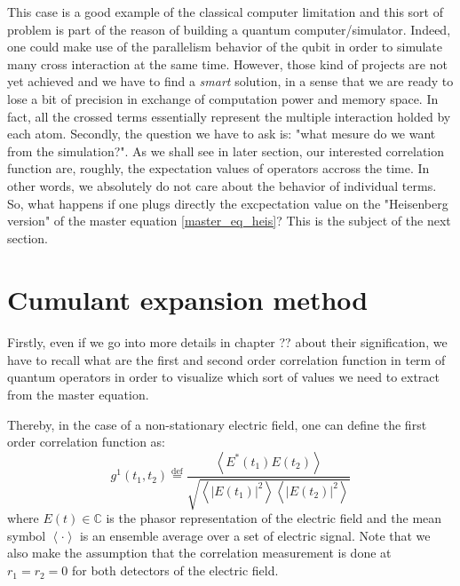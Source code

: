 \documentclass[12pt]{report}
\begin{document}
This case is a good example of the classical computer limitation and this sort of problem is part of the reason of building a quantum computer/simulator. Indeed, one could make use of the parallelism behavior of the qubit in order to simulate many cross interaction at the same time. However, those kind of projects are not yet achieved and we have to find a \textit{smart} solution, in a sense that we are ready to lose a bit of precision in exchange of computation power and memory space. In fact, all the crossed terms essentially represent the multiple interaction holded by each atom. Secondly, the question we have to ask is: "what mesure do we want from the simulation?". As we shall see in later section, our interested correlation function are, roughly, the expectation values of operators accross the time. In other words, we absolutely do not care about the behavior of individual terms. So, what happens if one plugs directly the excpectation value on the "Heisenberg version" of the master equation \eqref{master_eq_heis}? This is the subject of the next section.

\section{Cumulant expansion method}
\paragraph{}

Firstly, even if we go into more details in chapter ?? about their signification, we have to recall what are the first and second order correlation function in term of quantum operators in order to visualize which sort of values we need to extract from the master equation.

Thereby, in the case of a non-stationary electric field, one can define the first order correlation function as:
\begin{equation}
\label{g1_classic_def}
{\displaystyle g ^{1}(t_{1},t_{2})\stackrel{\text{def}}{=}{\frac {\left\langle E^{*}(t_{1})E(t_{2})\right\rangle }{\sqrt{\left\langle \left|E(t_{1})\right|^{2}\right\rangle \left\langle \left|E(t_{2})\right|^{2}\right\rangle }}}}
\end{equation}
where $E(t) \in \mathbb{C}$ is the phasor representation of the electric field and the mean symbol $\left\langle \cdot \right\rangle$ is an ensemble average over a set of electric signal. Note that we also make the assumption that the correlation measurement is done at $r_1 = r_2 = 0$ for both detectors of the electric field.
\end{document}
